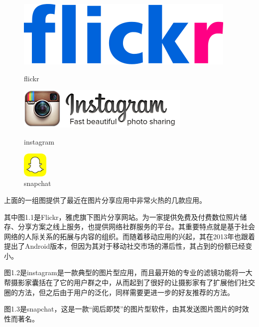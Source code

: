 \begin{figure}[h] 
\begin{minipage}[t]{0.3\linewidth}
\centering
\includegraphics[width=\textwidth]{img/chap1/flickr.png}
\caption{flickr \label{flickr}}
\end{minipage}
\hfill
\begin{minipage}[t]{0.3\linewidth}
\centering
\includegraphics[width=\textwidth]{img/chap1/instagram.png}
\caption{instagram\label{instagram}}
\end{minipage}
\begin{minipage}[t]{0.3\linewidth}
\centering
\includegraphics[width=1.2cm,height=1.2cm]{img/chap1/snapchat.png}
\caption{snapchat\label{snapchat}}
\end{minipage}

\end{figure}

上面的一组图提供了最近在图片分享应用中非常火热的几款应用。

其中图1.1是Flickr，雅虎旗下图片分享网站。为一家提供免费及付费数位照片储存、分享方案之线上服务，也提供网络社群服务的平台。其重要特点就是基于社会网络的人际关系的拓展与内容的组织。而随着移动应用的兴起，其在2013年也跟着提出了Android版本，但因为其对于移动社交市场的滞后性，其占到的份额已经变小。

图1.2是instagram是一款典型的图片型应用，而且最开始的专业的滤镜功能将一大帮摄影家囊括在了它的用户群之中，从而起到了很好的让摄影家有了扩展他们社交圈的方法，但之后由于用户的泛化，同样需要更进一步的好友推荐的方法。

图1.3是snapchat，这是一款“阅后即焚”的图片型软件，由其发送图片图片的时效性而著名。

